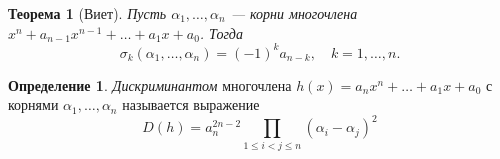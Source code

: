 \documentclass[a4paper]{article}
\theoremstyle{plain}
\newtheorem*{theorem}{Теорема}
\theoremstyle{definition}
\newtheorem{definition}{Определение}
\numberwithin{definition}{section}
\numberwithin{proposal}{section}
\begin{document}
\begin{theorem}[Виет]
Пусть \(\alpha_1, \dots, \alpha_n\) --- корни многочлена \(x^n + a_{n-1}x^{n-1} + \dots + a_1x + a_0\). Тогда
\begin{equation*}
	\sigma_k(\alpha_1, \dots, \alpha_n) = (-1)^k a_{n-k}, \quad k = 1, \dots, n.
\end{equation*}
\end{theorem}

\begin{definition}
\emph{Дискриминантом} многочлена \(h(x) = a_nx^n + \dots + a_1x + a_0\) с корнями \(\alpha_1, \dots, \alpha_n\) называется выражение
\begin{equation*}
	D(h) = a_{n}^{2n-2} \prod_{1 \leqslant i < j \leqslant n} (\alpha_i - \alpha_j)^2
\end{equation*}
\end{definition}
\end{document}
